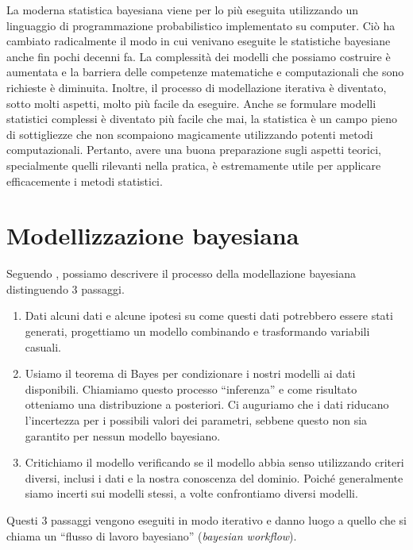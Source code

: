\documentclass[
  11pt,
]{krantz}
\providecommand{\tightlist}{%
  \setlength{\itemsep}{0pt}\setlength{\parskip}{0pt}}
\theoremstyle{definition}
\theoremstyle{definition}
\theoremstyle{definition}
\theoremstyle{definition}
\theoremstyle{remark}
\begin{document}
La moderna statistica bayesiana viene per lo più eseguita utilizzando un linguaggio di programmazione probabilistico implementato su computer. Ciò ha cambiato radicalmente il modo in cui venivano eseguite le statistiche bayesiane anche fin pochi decenni fa. La complessità dei modelli che possiamo costruire è aumentata e la barriera delle competenze matematiche e computazionali che sono richieste è diminuita. Inoltre, il processo di modellazione iterativa è diventato, sotto molti aspetti, molto più facile da eseguire. Anche se formulare modelli statistici complessi è diventato più facile che mai, la statistica è un campo pieno di sottigliezze che non scompaiono magicamente utilizzando potenti metodi computazionali. Pertanto, avere una buona preparazione sugli aspetti teorici, specialmente quelli rilevanti nella pratica, è estremamente utile per applicare efficacemente i metodi statistici.

\hypertarget{modellizzazione-bayesiana}{%
\section{Modellizzazione bayesiana}\label{modellizzazione-bayesiana}}

Seguendo \citep{martin2022bayesian}, possiamo descrivere il processo della modellazione bayesiana distinguendo 3 passaggi.

\begin{enumerate}
\def\labelenumi{\arabic{enumi}.}
\tightlist
\item
  Dati alcuni dati e alcune ipotesi su come questi dati potrebbero essere stati generati, progettiamo un modello combinando e trasformando variabili casuali.
\item
  Usiamo il teorema di Bayes per condizionare i nostri modelli ai dati disponibili. Chiamiamo questo processo ``inferenza'' e come risultato otteniamo una distribuzione a posteriori. Ci auguriamo che i dati riducano l'incertezza per i possibili valori dei parametri, sebbene questo non sia garantito per nessun modello bayesiano.
\item
  Critichiamo il modello verificando se il modello abbia senso utilizzando criteri diversi, inclusi i dati e la nostra conoscenza del dominio. Poiché generalmente siamo incerti sui modelli stessi, a volte confrontiamo diversi modelli.
\end{enumerate}

Questi 3 passaggi vengono eseguiti in modo iterativo e danno luogo a quello che si chiama un ``flusso di lavoro bayesiano'' (\emph{bayesian workflow}).
\end{document}
